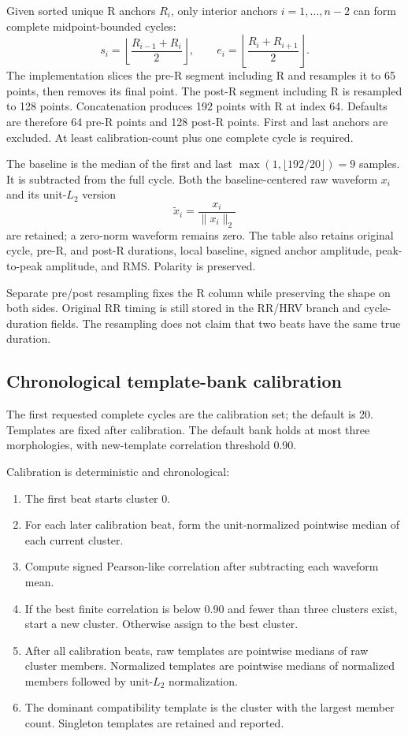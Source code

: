 \documentclass[11pt,a4paper]{article}
\begin{document}
Given sorted unique R anchors $R_i$, only interior anchors $i=1,\ldots,n-2$ can form complete midpoint-bounded cycles:
\[
s_i=\left\lfloor\frac{R_{i-1}+R_i}{2}\right\rfloor,\qquad
e_i=\left\lfloor\frac{R_i+R_{i+1}}{2}\right\rfloor.
\]
The implementation slices the pre-R segment including R and resamples it to 65 points, then removes its final point. The post-R segment including R is resampled to 128 points. Concatenation produces 192 points with R at index 64. Defaults are therefore 64 pre-R points and 128 post-R points. First and last anchors are excluded. At least calibration-count plus one complete cycle is required.

The baseline is the median of the first and last $\max(1,\lfloor192/20\rfloor)=9$ samples. It is subtracted from the full cycle. Both the baseline-centered raw waveform $x_i$ and its unit-$L_2$ version
\[
\widetilde{x}_i = \frac{x_i}{\lVert x_i\rVert_2}
\]
are retained; a zero-norm waveform remains zero. The table also retains original cycle, pre-R, and post-R durations, local baseline, signed anchor amplitude, peak-to-peak amplitude, and RMS. Polarity is preserved.

Separate pre/post resampling fixes the R column while preserving the shape on both sides. Original RR timing is still stored in the RR/HRV branch and cycle-duration fields. The resampling does not claim that two beats have the same true duration.

\subsection{Chronological template-bank calibration}

The first requested complete cycles are the calibration set; the default is 20. Templates are fixed after calibration. The default bank holds at most three morphologies, with new-template correlation threshold 0.90.

Calibration is deterministic and chronological:

\begin{enumerate}
  \item The first beat starts cluster 0.
  \item For each later calibration beat, form the unit-normalized pointwise median of each current cluster.
  \item Compute signed Pearson-like correlation after subtracting each waveform mean.
  \item If the best finite correlation is below 0.90 and fewer than three clusters exist, start a new cluster. Otherwise assign to the best cluster.
  \item After all calibration beats, raw templates are pointwise medians of raw cluster members. Normalized templates are pointwise medians of normalized members followed by unit-$L_2$ normalization.
  \item The dominant compatibility template is the cluster with the largest member count. Singleton templates are retained and reported.
\end{enumerate}
\end{document}
